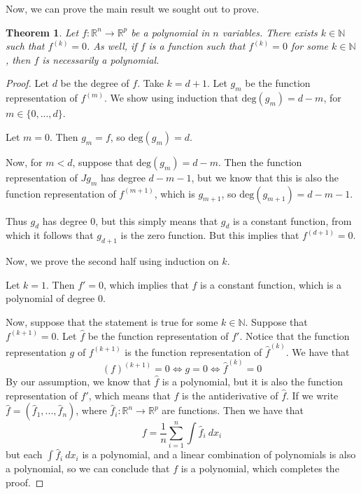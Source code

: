 \documentclass{article}
\theoremstyle{plain} %
\newtheorem{thm}{Theorem}
\numberwithin{thm}{section} %
\theoremstyle{definition}
\begin{document}
    Now, we can prove the main result we sought out to prove.
    \begin{thm}
        Let \(f : \mathbb{R}^n \to \mathbb{R}^p\) be a polynomial in \(n\) variables. There exists \(k \in \mathbb{N}\) such that \(f^{(k)} = 0\). As well, if \(f\) is a function such that \(f^{(k)} = 0\) for some \(k \in \mathbb{N}\), then \(f\) is necessarily a polynomial.
    \end{thm}
    \begin{proof}
        Let \(d\) be the degree of \(f\). Take \(k = d + 1\). Let \(g_m\) be the function representation of \(f^{(m)}\). We show using induction that \(\mathrm{deg} (g_m) = d - m\), for \(m \in \{ 0, ..., d \}\).

        Let \(m = 0\). Then \(g_m = f\), so \(\mathrm{deg} (g_m) = d\).

        Now, for \(m < d\), suppose that \(\mathrm{deg} (g_m) = d - m\). Then the function representation of \(Jg_m\) has degree \(d - m - 1\), but we know that this is also the function representation of \(f^{(m+1)}\), which is \(g_{m+1}\), so \(\mathrm{deg} (g_{m+1}) = d - m - 1\).

        Thus \(g_d\) has degree 0, but this simply means that \(g_d\) is a constant function, from which it follows that \(g_{d+1}\) is the zero function. But this implies that \(f^{(d+1)} = 0\).

        Now, we prove the second half using induction on \(k\).

        Let \(k = 1\). Then \(f' = 0\), which implies that \(f\) is a constant function, which is a polynomial of degree 0.

        Now, suppose that the statement is true for some \(k \in \mathbb{N}\). Suppose that \(f^{(k+1)} = 0\). Let \(\hat{f}\) be the function representation of \(f'\). Notice that the function representation \(g\) of \(f^{(k+1)}\) is the function representation of \(\hat{f}^{(k)}\). We have that
        \[
            (f)^{(k+1)} = 0 \iff g = 0 \iff \hat{f}^{(k)} = 0
        \]
        By our assumption, we know that \(\hat{f}\) is a polynomial, but it is also the function representation of \(f'\), which means that \(f\) is the antiderivative of \(\hat{f}\). If we write \(\hat{f} = (\hat{f}_1, ..., \hat{f}_n)\), where \(\hat{f}_i : \mathbb{R}^n \to \mathbb{R}^p\) are functions. Then we have that
        \[
            f = \frac{1}{n}\sum_{i=1}^{n} \int \hat{f}_i\ dx_i
        \]
        but each \(\int \hat{f}_i\ dx_i\) is a polynomial, and a linear combination of polynomials is also a polynomial, so we can conclude that \(f\) is a polynomial, which completes the proof.
    \end{proof}
\end{document}
